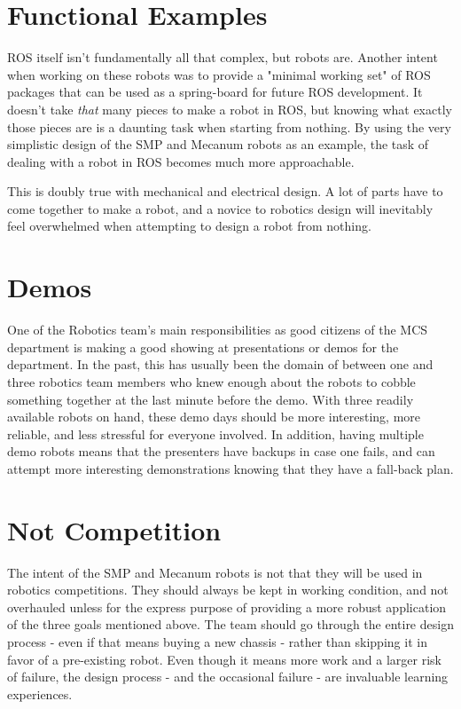 \section{Functional Examples}

ROS itself isn't fundamentally all that complex, but robots are. Another intent when working on these robots was to provide a "minimal working set" of ROS packages that can be used as a spring-board for future ROS development. It doesn't take \textit{that} many pieces to make a robot in ROS, but knowing what exactly those pieces are is a daunting task when starting from nothing. By using the very simplistic design of the SMP and Mecanum robots as an example, the task of dealing with a robot in ROS becomes much more approachable.

This is doubly true with mechanical and electrical design. A lot of parts have to come together to make a robot, and a novice to robotics design will inevitably feel overwhelmed when attempting to design a robot from nothing.

\section{Demos}

One of the Robotics team's main responsibilities as good citizens of the MCS department is making a good showing at presentations or demos for the department. In the past, this has usually been the domain of between one and three robotics team members who knew enough about the robots to cobble something together at the last minute before the demo. With three readily available robots on hand, these demo days should be more interesting, more reliable, and less stressful for everyone involved. In addition, having multiple demo robots means that the presenters have backups in case one fails, and can attempt more interesting demonstrations knowing that they have a fall-back plan.

\section{Not Competition}

The intent of the SMP and Mecanum robots is not that they will be used in robotics competitions. They should always be kept in working condition, and not overhauled unless for the express purpose of providing a more robust application of the three goals mentioned above. The team should go through the entire design process - even if that means buying a new chassis - rather than skipping it in favor of a pre-existing robot. Even though it means more work and a larger risk of failure, the design process - and the occasional failure - are invaluable learning experiences.
